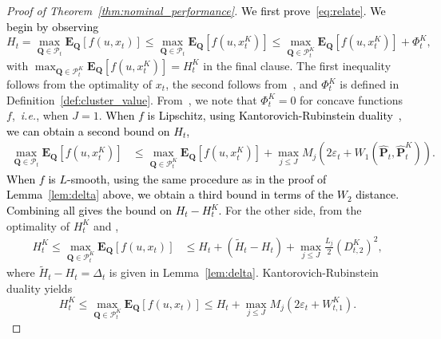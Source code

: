 \documentclass[12pt]{article}
\newcommand{\ie}{{\it i.e.}}
\newcommand{\prob}{{\mathbf P}}
\newcommand{\unc}{u}
\newcommand{\epsnom}{\varepsilon}
\newcommand{\ld}{W}
\newcommand{\RC}[1]{\textcolor{black}{#1}}
\newcommand{\RC}[1]{\textcolor{blue}{#1}}
\begin{document}
\begin{proof}[Proof of Theorem~\ref{thm:nominal_performance}]
\RC{We first prove~\eqref{eq:relate}. We begin by observing} 
\begin{equation*}
    H_t = \max_{\mathbf{Q} \in \mathcal{P}_{t}} \mathbf{E}_{\mathbf{Q}}[f( \unc,x_t)] \leq \max_{\mathbf{Q} \in \mathcal{P}_{t}} \mathbf{E}_{\mathbf{Q}}[f(\unc, x^K_{t})] \leq \max_{\mathbf{Q} \in \mathcal{P}^K_{t}} \mathbf{E}_{\mathbf{Q}}[f(\unc, x^K_{t})]  + \Phi^K_{t},
\end{equation*}
with $\max_{\mathbf{Q} \in \mathcal{P}^K_{t}}\mathbf{E}_{\mathbf{Q}}[f(\unc, x^K_{t})] = H^K_t$ in the final clause. 
The first inequality follows from the optimality of $x_t$, the second follows from~\cite[Theorem 5]{mro}, 
and $\Phi^K_t$ is defined in Definition~\ref{def:cluster_value}.
From~\cite[Theorem 4]{mro}, we note that $\Phi^K_{t}=0$ for concave functions $f$,~\ie, when $J=1$.
\RC{When $f$ is Lipschitz, using Kantorovich-Rubinstein duality~\cite{kantorovich_duality}, we can obtain a second bound on $H_t$,}
\begin{equation*}
\begin{aligned}
        \max_{\mathbf{Q} \in \mathcal{P}_{t}} \mathbf{E}_{\mathbf{Q}}[f(\unc, x^K_{t})] &\leq  \max_{\mathbf{Q} \in \mathcal{P}^K_{t}} \mathbf{E}_{\mathbf{Q}}[f(\unc, x^K_{t})] + \max_{j\leq J}M_j(2\epsnom_{t} + W_1(\hat{\prob}_{t},\hat{\prob}^K_{t})).
    \end{aligned}
\end{equation*}
\RC{When $f$ is $L$-smooth, using the same procedure as in the proof of Lemma~\ref{lem:delta} above, we obtain a third bound in terms of the $W_2$ distance.} 
\RC{Combining all gives the bound on $H_t - H^K_t$.} For the other side, from the optimality of $H^K_t$ and \cite[Theorem 5]{mro},
\begin{equation*}
\begin{aligned}
    H^K_t \leq \max_{\mathbf{Q} \in \mathcal{P}^K_{t}} \mathbf{E}_{\mathbf{Q}}[f(\unc, x_{t})] &\leq  H_t + (\tilde{H}_t - H_t) + {\max_{j \leq J}\frac{L_j}{2}}(D^K_{t,2})^2,
\end{aligned}
\end{equation*}
where $\tilde{H}_t - H_t =\Delta_t$ is given in Lemma~\ref{lem:delta}. 
Kantorovich-Rubinstein duality yields 
\begin{equation*} H^K_t \leq \max_{\mathbf{Q} \in \mathcal{P}^K_{t}} \mathbf{E}_{\mathbf{Q}}[f(\unc, x_{t})] \leq H_t + \max_{j\leq J}M_j(2\epsnom_{t} +\ld^K_{t,1}).\end{equation*}

\end{proof}
\end{document}

